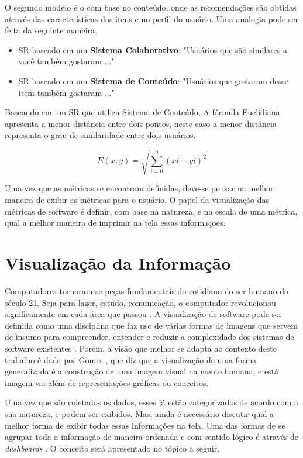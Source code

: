 O segundo modelo é o com base no conteúdo, onde as recomendações são obtidas através das características dos itens e no perfil do usuário. Uma analogia pode ser feita da seguinte maneira.

 \begin{itemize}
 \item SR baseado em um \textbf{Sistema Colaborativo}: "Usuários que são similares a você também gostaram ..."
 \item SR baseado em um \textbf{Sistema de Conteúdo}: "Usuários que gostaram desse item também gostaram ..." 
 \end{itemize}
 

Baseando em um SR que utiliza Sistema de Conteúdo, A fórmula Euclidiana apresenta a menor distância entre dois pontos, neste caso a menor distância representa o grau de similaridade entre dois usuários. 

\[E(x,y) = \sqrt{\sum_{i=0}^{n}(xi-yi)^{2}}\]


Uma vez que as métricas se encontram definidas, deve-se pensar na melhor maneira de exibir as métricas para o usuário. O papel da visualização das métricas de software é definir, com base na natureza, e na escala de uma métrica, qual a melhor maneira de imprimir na tela essas informações.


\section{Visualização da Informação}
Computadores tornaram-se peças fundamentais do cotidiano do ser humano do século 21. Seja para lazer, estudo, comunicação, o computador revolucionou significamente em cada área que passou \cite{hasan_humancomputer_2014}.
A visualização de software pode ser definida como uma disciplina que faz uso de várias formas de imagens que servem de insumo para compreender, entender e reduzir a complexidade dos sistemas de software existentes \cite{gracanin_software_2005}. Porém, a visão que melhor se adapta ao contexto deste trabalho é dada por Gomes \cite{gomes_percepcao_2011}, que diz que a visualização de uma forma generalizada é a construção de uma imagem visual na mente humana, e está imagem vai além de representações gráficas ou conceitos.

Uma vez que são coletados os dados, esses já estão categorizados de acordo com a sua natureza, e podem ser exibidos. Mas, ainda é necessário discutir qual a melhor forma de exibir  todas essas informações na tela. Uma das formas de se agrupar toda a informação de maneira ordenada e com sentido lógico é através de \textit{dashboards} \cite{book_design}. O conceito será apresentado no tópico a seguir.


